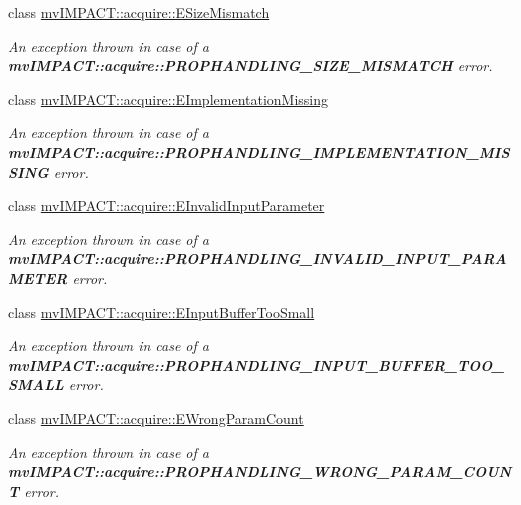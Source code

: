 \begin{DoxyCompactItemize}
class \hyperlink{classmv_i_m_p_a_c_t_1_1acquire_1_1_e_size_mismatch}{mv\+I\+M\+P\+A\+C\+T\+::acquire\+::\+E\+Size\+Mismatch}
\begin{DoxyCompactList}\small\item\em An exception thrown in case of a {\bfseries mv\+I\+M\+P\+A\+C\+T\+::acquire\+::\+P\+R\+O\+P\+H\+A\+N\+D\+L\+I\+N\+G\+\_\+\+S\+I\+Z\+E\+\_\+\+M\+I\+S\+M\+A\+T\+C\+H} error. \end{DoxyCompactList}\item 
class \hyperlink{classmv_i_m_p_a_c_t_1_1acquire_1_1_e_implementation_missing}{mv\+I\+M\+P\+A\+C\+T\+::acquire\+::\+E\+Implementation\+Missing}
\begin{DoxyCompactList}\small\item\em An exception thrown in case of a {\bfseries mv\+I\+M\+P\+A\+C\+T\+::acquire\+::\+P\+R\+O\+P\+H\+A\+N\+D\+L\+I\+N\+G\+\_\+\+I\+M\+P\+L\+E\+M\+E\+N\+T\+A\+T\+I\+O\+N\+\_\+\+M\+I\+S\+S\+I\+N\+G} error. \end{DoxyCompactList}\item 
class \hyperlink{classmv_i_m_p_a_c_t_1_1acquire_1_1_e_invalid_input_parameter}{mv\+I\+M\+P\+A\+C\+T\+::acquire\+::\+E\+Invalid\+Input\+Parameter}
\begin{DoxyCompactList}\small\item\em An exception thrown in case of a {\bfseries mv\+I\+M\+P\+A\+C\+T\+::acquire\+::\+P\+R\+O\+P\+H\+A\+N\+D\+L\+I\+N\+G\+\_\+\+I\+N\+V\+A\+L\+I\+D\+\_\+\+I\+N\+P\+U\+T\+\_\+\+P\+A\+R\+A\+M\+E\+T\+E\+R} error. \end{DoxyCompactList}\item 
class \hyperlink{classmv_i_m_p_a_c_t_1_1acquire_1_1_e_input_buffer_too_small}{mv\+I\+M\+P\+A\+C\+T\+::acquire\+::\+E\+Input\+Buffer\+Too\+Small}
\begin{DoxyCompactList}\small\item\em An exception thrown in case of a {\bfseries mv\+I\+M\+P\+A\+C\+T\+::acquire\+::\+P\+R\+O\+P\+H\+A\+N\+D\+L\+I\+N\+G\+\_\+\+I\+N\+P\+U\+T\+\_\+\+B\+U\+F\+F\+E\+R\+\_\+\+T\+O\+O\+\_\+\+S\+M\+A\+L\+L} error. \end{DoxyCompactList}\item 
class \hyperlink{classmv_i_m_p_a_c_t_1_1acquire_1_1_e_wrong_param_count}{mv\+I\+M\+P\+A\+C\+T\+::acquire\+::\+E\+Wrong\+Param\+Count}
\begin{DoxyCompactList}\small\item\em An exception thrown in case of a {\bfseries mv\+I\+M\+P\+A\+C\+T\+::acquire\+::\+P\+R\+O\+P\+H\+A\+N\+D\+L\+I\+N\+G\+\_\+\+W\+R\+O\+N\+G\+\_\+\+P\+A\+R\+A\+M\+\_\+\+C\+O\+U\+N\+T} error. \end{DoxyCompactList}\item 

\end{DoxyCompactItemize}
